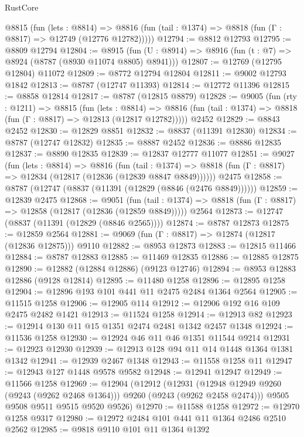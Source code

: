 \begin{lexlean}{RustCore}
\begin{coremodule}
    @8815
      (fun (lets : @8814) =>
      @8816 (fun (tail : @1374) => @8818 (fun (Γ : @8817) => @12749 (@12776 @12782)))))
@12794 := @8812 @12793
@12795 := @8809 @12794
@12804 := @8915
    (fun (U : @8914) => @8916 (fun (t : @7) => @8924 (@8787 (@8930 @11074 @8805) @8941)))
@12807 := @12769 (@12795 @12804) @11072
@12809 := @8772 @12794 @12804
@12811 := @9002 @12793 @1842
@12813 := @8787 (@12747 @11393)
@12814 := @12772 @11396
@12815 := @8858 @12814
@12817 := @8787 (@12815 @8879)
@12828 := @9005
    (fun (rty : @1211) =>
    @8815
      (fun (lets : @8814) =>
      @8816 (fun (tail : @1374) => @8818 (fun (Γ : @8817) => @12813 (@12817 @12782)))))
    @2452
@12829 := @8843 @2452
@12830 := @12829 @8851
@12832 := @8837 (@11391 @12830)
@12834 := @8787 (@12747 @12832)
@12835 := @8887 @2452
@12836 := @8886 @12835
@12837 := @8890 @12835
@12839 := @12837 @12777 @11077
@12851 := @9027
    (fun (lets : @8814) =>
    @8816
      (fun (tail : @1374) =>
      @8818 (fun (Γ : @8817) => @12834 (@12817 (@12836 (@12839 @8847 @8849))))))
    @2475
@12858 := @8787 (@12747 (@8837 (@11391 (@12829 (@8846 (@2476 @8849))))))
@12859 := @12839 @2475
@12868 := @9051
    (fun (tail : @1374) => @8818 (fun (Γ : @8817) => @12858 (@12817 (@12836 (@12859 @8849)))))
    @2564
@12873 := @12747 (@8837 (@11391 (@12829 (@8846 @2565))))
@12874 := @8787 @12873
@12875 := @12859 @2564
@12881 := @9069 (fun (Γ : @8817) => @12874 (@12817 (@12836 @12875))) @9110
@12882 := @8953 @12873
@12883 := @12815 @11466
@12884 := @8787 @12883
@12885 := @11469 @12835
@12886 := @12885 @12875
@12890 := @12882 (@12884 @12886) (@9123 @12746)
@12894 := @8953 @12883 @12886 (@9128 @12814)
@12895 := @11480 @1258
@12896 := @12895 @1258
@12904 := @12896 @193 @101 @441 @11 @2475 @2484 @1364 @2564
@12905 := @11515 @1258
@12906 := @12905 @114
@12912 := @12906 @192 @16 @109 @2475 @2482 @1421
@12913 := @11524 @1258
@12914 := @12913 @82
@12923 := @12914 @130 @11 @15 @1351 @2474 @2481 @1342 @2457 @1348
@12924 := @11536 @1258
@12930 := @12924 @46 @11 @46 @1351 @11544 @9214
@12931 := @12923 @12930
@12939 := @12913 @128 @94 @11 @14 @1448 @1364 @1381 @1342
@12941 := @12939 @2467 @1348
@12943 := @11558 @1258 @11
@12947 := @12943 @127 @1448 @9578 @9582
@12948 := @12941 @12947
@12949 := @11566 @1258
@12969 := @12904
    (@12912
      (@12931 (@12948 @12949 @9260 (@9243 (@9262 @2468 @1364))) @9260 (@9243 (@9262 @2458 @2474)))
      @9505
      @9508
      @9511
      @9515
      @9520
      @9526)
@12970 := @11588 @1258
@12972 := @12970 @1258 @9317
@12980 := @12972 @2484 @101 @441 @11 @1364 @2486 @2510 @2562
@12985 := @9818 @9110 @101 @11 @1364 @1392

\end{coremodule}
\end{lexlean}
